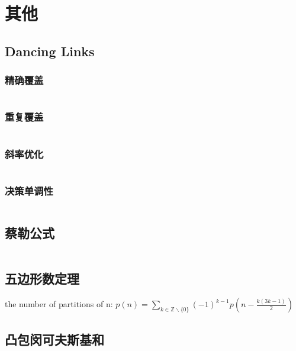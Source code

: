 \section{其他}
\subsection{Dancing Links}
\subsubsection{精确覆盖}
\inputminted{cpp}{\source/others/exact.cpp}
\subsubsection{重复覆盖}
\inputminted{cpp}{\source/others/rader.cpp}
\subsubsection{斜率优化}
\inputminted{cpp}{\source/others/optimize.cpp}
\subsubsection{决策单调性}
\inputminted{cpp}{\source/others/dicision.cpp}
\subsection{蔡勒公式}
\inputminted{cpp}{\source/others/zellers-congruence.cpp}
\subsection{五边形数定理}
the number of partitions of n:
$p(n) = \sum_{k \in \mathbb{Z} \backslash \{0\}} (-1)^{k - 1}p(n - \frac{k(3k-1)}{2})$
\subsection{凸包闵可夫斯基和}
\inputminted{cpp}{\source/others/mink.cpp}
